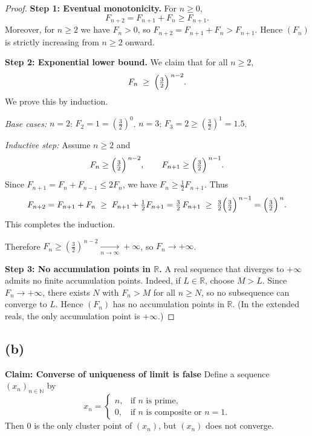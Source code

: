 \documentclass[12pt,a4paper]{article}
\theoremstyle{definition}
\theoremstyle{remark}
\begin{document}
\begin{proof}
\textbf{Step 1: Eventual monotonicity.}
For $n\ge 0$,
\[
F_{n+2}=F_{n+1}+F_n\ge F_{n+1}.
\]
Moreover, for $n\ge 2$ we have $F_n>0$, so $F_{n+2}=F_{n+1}+F_n>F_{n+1}$. Hence $(F_n)$ is strictly increasing from $n\ge 2$ onward.

\medskip
\textbf{Step 2: Exponential lower bound.}
We claim that for all $n\ge 2$,
\[
F_n \;\ge\; \Bigl(\tfrac{3}{2}\Bigr)^{\,n-2}.
\]
We prove this by induction.

\emph{Base cases:} $n=2$: $F_2=1=(\tfrac{3}{2})^0$. 
$n=3$: $F_3=2\ge (\tfrac{3}{2})^1=1.5$.

\emph{Inductive step:} Assume $n\ge 2$ and
\[
F_{n}\ge \Bigl(\tfrac{3}{2}\Bigr)^{\,n-2},\qquad
F_{n+1}\ge \Bigl(\tfrac{3}{2}\Bigr)^{\,n-1}.
\]
Since $F_{n+1}=F_n+F_{n-1}\le 2F_n$, we have $F_n\ge \tfrac{1}{2}F_{n+1}$. Thus
\[
F_{n+2}=F_{n+1}+F_n \;\ge\; F_{n+1}+\tfrac{1}{2}F_{n+1}
=\tfrac{3}{2}\,F_{n+1}\;\ge\;\tfrac{3}{2}\Bigl(\tfrac{3}{2}\Bigr)^{\,n-1}
=\Bigl(\tfrac{3}{2}\Bigr)^{\,n}.
\]
This completes the induction.

Therefore $F_n\ge (\tfrac{3}{2})^{\,n-2}\xrightarrow[n\to\infty]{}+\infty$, so $F_n\to +\infty$.

\medskip
\textbf{Step 3: No accumulation points in $\mathbb{R}$.}
A real sequence that diverges to $+\infty$ admits no finite accumulation points. Indeed, if $L\in\mathbb{R}$, choose $M>L$. Since $F_n\to+\infty$, there exists $N$ with $F_n>M$ for all $n\ge N$, so no subsequence can converge to $L$. Hence $(F_n)$ has no accumulation points in $\mathbb{R}$. (In the extended reals, the only accumulation point is $+\infty$.)
\end{proof}



\subsection*{(b)}
\textbf{Claim: Converse of uniqueness of limit is false}
Define a sequence $(x_n)_{n\in\mathbb{N}}$ by
\[
x_n=\begin{cases}
n, & \text{if $n$ is prime},\\[4pt]
0, & \text{if $n$ is composite or }n=1.
\end{cases}
\]
Then $0$ is the only cluster point of $(x_n)$, but $(x_n)$ does not converge.
\end{document}
